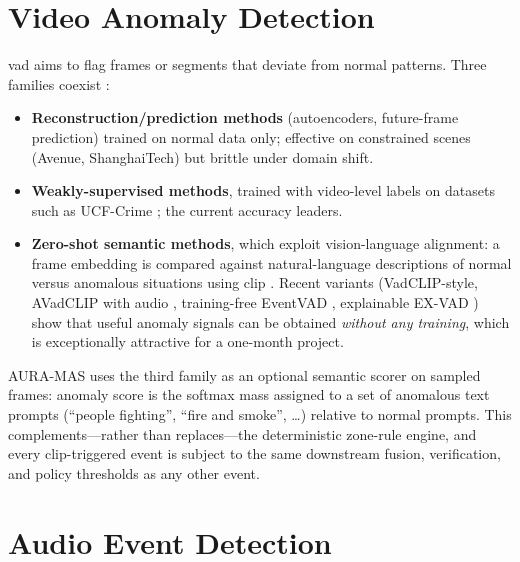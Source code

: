 \section{Video Anomaly Detection}

\gls{vad} aims to flag frames or segments that deviate from normal patterns. Three families coexist \cite{gong2025survey}:

\begin{itemize}
    \item \textbf{Reconstruction/prediction methods} (autoencoders, future-frame prediction) trained on normal data only; effective on constrained scenes (Avenue, ShanghaiTech) but brittle under domain shift.
    \item \textbf{Weakly-supervised methods}, trained with video-level labels on datasets such as UCF-Crime \cite{sultani2018ucfcrime}; the current accuracy leaders.
    \item \textbf{Zero-shot semantic methods}, which exploit vision-language alignment: a frame embedding is compared against natural-language descriptions of normal versus anomalous situations using \gls{clip} \cite{radford2021clip}. Recent variants (VadCLIP-style, AVadCLIP with audio \cite{wu2025avadclip}, training-free EventVAD \cite{shao2025eventvad}, explainable EX-VAD \cite{huang2025exvad}) show that useful anomaly signals can be obtained \emph{without any training}, which is exceptionally attractive for a one-month project.
\end{itemize}

AURA-MAS uses the third family as an optional semantic scorer on sampled frames: anomaly score is the softmax mass assigned to a set of anomalous text prompts (``people fighting'', ``fire and smoke'', \ldots) relative to normal prompts. This complements---rather than replaces---the deterministic zone-rule engine, and every \gls{clip}-triggered event is subject to the same downstream fusion, verification, and policy thresholds as any other event.

\section{Audio Event Detection}

